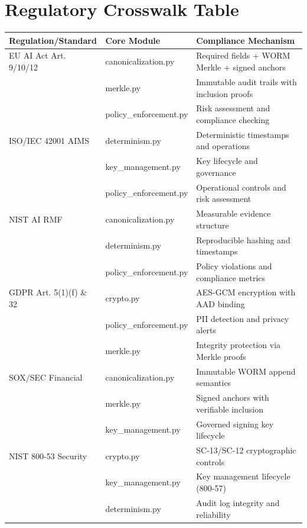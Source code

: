 \documentclass[11pt,a4paper]{article}
\begin{document}
\section{Regulatory Crosswalk Table}

\begin{longtable}{|p{4cm}|p{3cm}|p{8cm}|}
\hline
\textbf{Regulation/Standard} & \textbf{Core Module} & \textbf{Compliance Mechanism} \\
\hline
\endhead

EU AI Act Art. 9/10/12 & canonicalization.py & Required fields + WORM Merkle + signed anchors \\
& merkle.py & Immutable audit trails with inclusion proofs \\
& policy\_enforcement.py & Risk assessment and compliance checking \\
\hline

ISO/IEC 42001 AIMS & determinism.py & Deterministic timestamps and operations \\
& key\_management.py & Key lifecycle and governance \\
& policy\_enforcement.py & Operational controls and risk assessment \\
\hline

NIST AI RMF & canonicalization.py & Measurable evidence structure \\
& determinism.py & Reproducible hashing and timestamps \\
& policy\_enforcement.py & Policy violations and compliance metrics \\
\hline

GDPR Art. 5(1)(f) \& 32 & crypto.py & AES-GCM encryption with AAD binding \\
& policy\_enforcement.py & PII detection and privacy alerts \\
& merkle.py & Integrity protection via Merkle proofs \\
\hline

SOX/SEC Financial & canonicalization.py & Immutable WORM append semantics \\
& merkle.py & Signed anchors with verifiable inclusion \\
& key\_management.py & Governed signing key lifecycle \\
\hline

NIST 800-53 Security & crypto.py & SC-13/SC-12 cryptographic controls \\
& key\_management.py & Key management lifecycle (800-57) \\
& determinism.py & Audit log integrity and reliability \\
\hline

\end{longtable}
\end{document}
